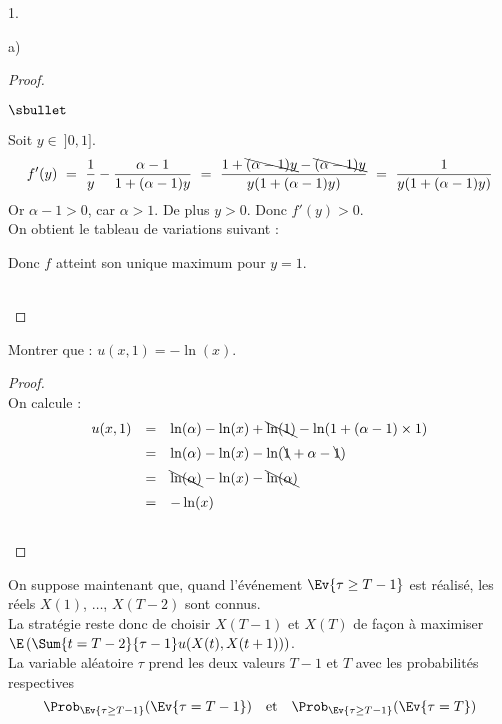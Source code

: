 \documentclass[11pt]{article}%
\begin{document}
\begin{noliste}{1.}
\begin{noliste}{a)}
\begin{proof}
\begin{noliste}{$\sbullet$}
	
	\item Soit $y \in \ ]0,1]$.
	\[
	  f'(y) \ = \ \dfrac{1}{y} - \dfrac{\alpha -1}{1+(\alpha-1)y}
	  \ = \ \dfrac{1+\bcancel{(\alpha-1)y} - \bcancel{(\alpha 
	  -1)y}}{y(1+(\alpha-1)y)} \ = \
	  \dfrac{1}{y (1+ (\alpha-1)y)}
	\]
	Or $\alpha-1 >0$, car $\alpha >1$. De plus $y>0$. Donc 
	$f'(y)>0$.\\
	On obtient le tableau de variations suivant :
	\begin{center}
      \end{center}
	Donc $f$ atteint son unique maximum pour $y=1$.
      \end{noliste}
      
      ~\\[-1.4cm]
    \end{proof}
    
    \item Montrer que : $u(x,1)=-\ln(x)$.
    
    \begin{proof}~\\
      On calcule :
      \[
        \begin{array}{rcl}
          u(x,1) &=& \ln(\alpha) - \ln(x) + \bcancel{\ln(1)} - 
          \ln(1+(\alpha -1) \times 1)
          \\[.2cm]
          &=& \ln(\alpha) - \ln(x) - \ln(\bcancel{1} + \alpha -
          \bcancel{1})
          \\[.2cm]
          &=& \bcancel{\ln(\alpha)} - \ln(x) - \bcancel{\ln(\alpha)}
          \\[.2cm]
          &=& - \ln(x)
        \end{array}
      \]
      ~\\[-1cm]
    \end{proof}
  \end{noliste}
  
  \item On suppose maintenant que, quand l'événement $\Ev{\tau \geq 
  T-1}$ est réalisé, les réels $X(1)$, $\ldots$, $X(T-2)$ sont connus. 
  \\[.1cm]
  La 
  stratégie reste donc de choisir $X(T-1)$ et $X(T)$ de façon à 
  maximiser $\E\left(\Sum{t=T-2}{\tau-1} u(X(t), 
  X(t+1))\right)$.\\[.1cm]
  La variable aléatoire $\tau$ prend les deux valeurs $T-1$ et $T$ 
  avec les probabilités respectives 
  \[
    \Prob_{\Ev{\tau \geq T-1}}(\Ev{\tau = T-1}) \quad \text{et} 
    \quad \Prob_{\Ev{\tau \geq T-1}}(\Ev{\tau = T})
  \]
  \end{noliste}
  
\end{document}
